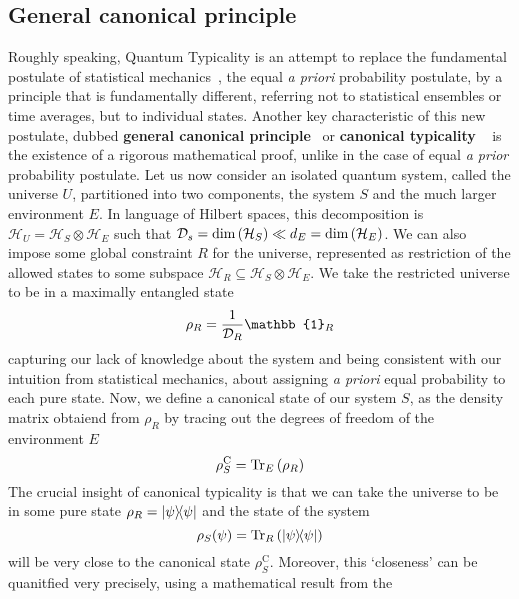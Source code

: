 \subsection{\label{sec:gcp} General canonical principle}
Roughly speaking, Quantum Typicality is an attempt to replace the fundamental postulate of statistical mechanics~\autocite{huang1987statistical},
the equal \textit{a priori} probability postulate, by a principle that is fundamentally different, referring not to
statistical ensembles or time averages, but to individual states. Another key characteristic of
this new postulate, dubbed \textbf{general canonical principle}~\autocite{Popescu2006} or \textbf{canonical typicality}
~\autocite{Goldstein2006} is the existence of a rigorous mathematical proof, unlike in the case of equal
 \textit{a prior} probability postulate. Let us now consider an isolated quantum system, called the universe \(U\), partitioned
 into two components, the system \(S\) and the much larger environment \(E\). In language of Hilbert spaces, this decomposition is
 \(\mathcal{H}_U = \mathcal{H}_S \otimes \mathcal{H}_E\) such that \(\mathcal{D}_s = \mathrm{dim}\left(\mathcal{H}_S\right)
 \ll d_E = \mathrm{dim}\left(\mathcal{H}_E\right)\). We can also impose some global constraint \(R\) for the universe, represented
 as restriction of the allowed states to some subspace \(\mathcal{H}_R \subseteq  \mathcal{H}_S \otimes \mathcal{H}_E \).
 We take the restricted universe to be in a maximally entangled state
 \begin{equation}
	\rho_R = \frac{1}{\dimension_R} \mathbb{1}_R
 \end{equation}
capturing our lack of knowledge about the system and being consistent with our intuition from statistical mechanics, about assigning
\textit{a priori} equal probability to each pure state. Now, we define a canonical state of our system \(S\), as the density
matrix obtaiend from \(\rho_R\) by tracing out the degrees of freedom of the environment \(E\)
\begin{equation}
	\rho_S^{\mathrm{C}} = \Tr_E\left(\rho_R\right)
\end{equation}
The crucial insight of canonical typicality is that we can take the universe to be in some pure state \(\rho_R = \ketbra{\psi}{\psi}\)
and the state of the system 
\begin{equation}
	\rho_S(\psi) = \Tr_R \left(\ketbra{\psi}{\psi}\right)
\end{equation}
 will be very close to the canonical state
\(\rho_S^{\mathrm{C}}\). Moreover, this `closeness' can be quanitfied very precisely, using a mathematical result from the
